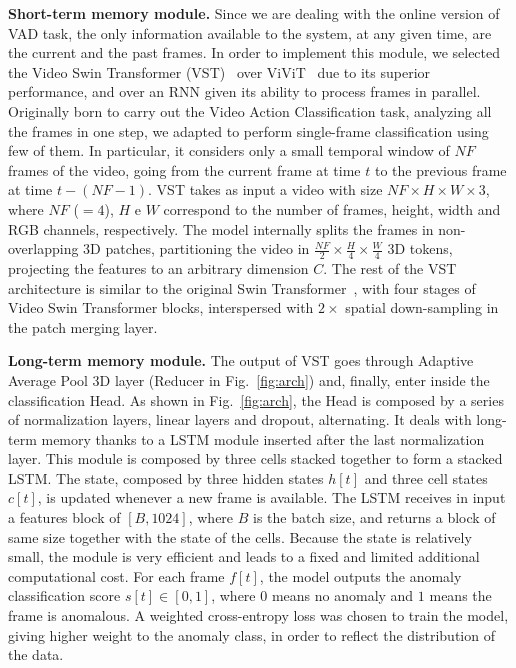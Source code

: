 \noindent\textbf{Short-term memory module.}
Since we are dealing with the online version of VAD task, the only information available to the system, at any given time, are the current and the past frames.
In order to implement this module, we selected the Video Swin Transformer (VST)~\cite{liu_video_2022} over ViViT~\cite{Arnab_2021_ICCV} due to its superior performance, and over an RNN given its ability to process frames in parallel.
Originally born to carry out the Video Action Classification task, analyzing all the frames in one step, we adapted to perform single-frame classification using few of them.
In particular, it considers only a small temporal window of $\mathit{NF}$ frames of the video, going from the current frame at time $t$ to the previous frame at time $t-\left(\mathit{NF}-1\right)$.
VST takes as input a video with size $\mathit{NF} \times H \times W \times 3$, where $\mathit{NF}$ ($=4$), $H$ e $W$ correspond to the number of frames, height, width and RGB channels, respectively.
The model internally splits the frames in non-overlapping 3D patches, partitioning the video in $\frac{\mathit{NF}}{2} \times \frac{H}{4} \times \frac{W}{4}$ 3D tokens, projecting the features to an arbitrary dimension $C$.
The rest of the VST architecture is similar to the original Swin Transformer~\cite{liu2021Swin}, with four stages of Video Swin Transformer blocks, interspersed with $2\times$ spatial down-sampling in the patch merging layer.

\noindent\textbf{Long-term memory module.}
The output of VST goes through Adaptive Average Pool 3D layer (Reducer in Fig.~\ref{fig:arch}) and, finally, enter inside the classification Head.
As shown in Fig.~\ref{fig:arch}, the Head is composed by a series of normalization layers, linear layers and dropout, alternating. 
It deals with long-term memory thanks to a LSTM module inserted after the last normalization layer.
This module is composed by three cells stacked together to form a stacked LSTM.
The state, composed by three hidden states $h[t]$ and three cell states $c[t]$, is updated whenever a new frame is available.
The LSTM receives in input a features block of $[B, 1024]$, where $B$ is the batch size, and returns a block of same size together with the state of the cells.
Because the state is relatively small, the module is very efficient and leads to a fixed and limited additional computational cost.
For each frame $f[t]$, the model outputs the anomaly classification score $s[t] \in [0,1]$, where $0$ means no anomaly and $1$ means the frame is anomalous.
A weighted cross-entropy loss was chosen to train the model, giving higher weight to the anomaly class, in order to reflect the distribution of the data.

